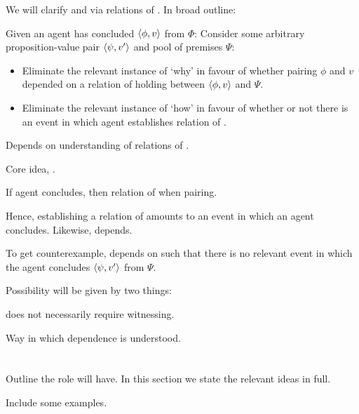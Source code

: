 \begin{note}
  We will clarify \qWhy{} and \qHow{} via relations of \support{}.
  In broad outline:


  Given an agent has concluded \(\langle \phi, v \rangle\) from \(\Phi\):
  Consider some arbitrary proposition-value pair \(\langle \psi, v' \rangle\) and pool of premises \(\Psi\):
  \begin{itemize}
  \item
    Eliminate the relevant instance of `why' in favour of whether pairing \(\phi\) and \(v\) depended on a relation of \support{} holding between \(\langle \phi, v \rangle\) and \(\Psi\).
  \item
    Eliminate the relevant instance of `how' in favour of whether or not there is an event in which agent establishes relation of \support{}.
  \end{itemize}

  Depends on understanding of relations of \support{}.

  Core idea, \ros{}.

  If agent concludes, then relation of \support{} when pairing.

  Hence, establishing a relation of \support{} amounts to an event in which an agent concludes.
  Likewise, depends.

  To get counterexample, depends on \ros{} such that there is no relevant event in which the agent concludes \(\langle \psi, v' \rangle\) from \(\Psi\).

  Possibility will be given by two things:

  \ros{} does not necessarily require witnessing.

  Way in which dependence is understood.
\end{note}


\section{}
\label{sec:support2}

\begin{note}
  Outline the role  will have.
  In this section we state the relevant ideas in full.
\end{note}

{
  \color{red} Include some examples.
}

\paragraph{\supportI{}}

